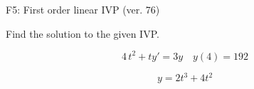 \begin{exercise}
  \begin{exerciseTitle}F5: First order linear IVP (ver. 76)\end{exerciseTitle}
  \begin{exerciseStatement}
    
Find the solution to the given IVP.

    
\[4 \, t^{2} +ty'= 3 y \hspace{1em} y( 4 ) = 192\]

  \end{exerciseStatement}
  \begin{exerciseAnswer}
    
\[y= 2 t^ 3 +4 t^{2}\]

  \end{exerciseAnswer}
\end{exercise}